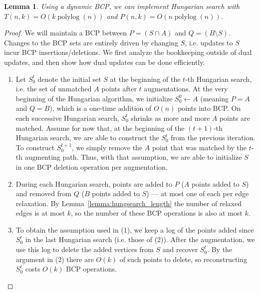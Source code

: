 \documentclass[11pt]{article}
\def\polylog{\mathop{\mathrm{polylog}}}
\theoremstyle{plain}
\newtheorem{lemma}{Lemma}
\begin{document}
\begin{lemma}
\label{lemma:hs_time}
	Using a dynamic BCP, we can implement Hungarian search with 
	$T(n, k) = O(k\polylog(n))$ and $P(n, k) = O(n\polylog(n))$.
\end{lemma}
\begin{proof}
	We will maintain a BCP between $P = (S \cap A)$ and 
	$Q = (B \setminus S)$.
	Changes to the BCP sets are entirely driven by changing $S$,
	i.e. updates to $S$ incur BCP insertions/deletions.
	We first analyze the bookkeeping outside of dual updates, and then
	show how dual updates can be done efficiently.

	\begin{enumerate}
	\item Let $S^t_0$ denote the initial set $S$ at the beginning of the 
		$t$-th Hungarian search, i.e. the set of unmatched $A$ points
		after $t$ augmentations.
		At the very beginning of the Hungarian algorithm, we initialize 
		$S^0_0 \gets A$ (meaning $P = A$ and $Q = B$), which is a 
		one-time addition of $O(n)$ points into BCP.
		On each successive Hungarian search, $S^t_0$ shrinks as more 
		and more $A$ points are matched.
		Assume for now that, at the beginning of the $(t+1)$-th 
		Hungarian search, we are able to construct the $S^t_0$ from the 
		previous iteration.
		To construct $S^{t+1}_0$, we simply remove the $A$ point that 
		was matched by the $t$-th augmenting path.
		Thus, with that assumption, we are able to initialize $S$ in 
		one BCP deletion operation per augmentation.

	\item During each Hungarian search, points are added to $P$ ($A$ points 
		added to $S$) and removed from $Q$ ($B$ points added to $S$)
		--- at most one of each per edge relaxation.
		By Lemma~\ref{lemma:hungsearch_length} the number of relaxed 
		edges is at most $k$, so the number of these BCP operations is 
		also at most $k$.

	\item To obtain the assumption used in (1), we keep a log of the 
		points added since $S^t_0$ in the last Hungarian search 
		(i.e. those of (2)).
		After the augmentation, we use this log to delete the added 
		vertices from $S$ and recover $S^t_0$.
		By the argument in (2) there are $O(k)$ of such points to 
		delete, so reconstructing $S^t_0$ costs $O(k)$ BCP operations.
	\end{enumerate}


\end{proof}
\end{document}
